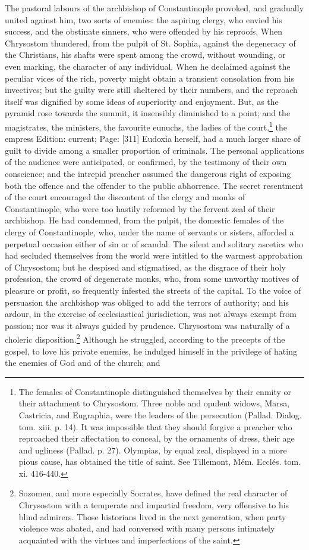 The pastoral labours of the archbishop of Constantinople provoked, and gradually united against him, two sorts of enemies: the aspiring clergy, who envied his success, and the obstinate sinners, who were offended by his reproofs. When Chrysostom thundered, from the pulpit of St. Sophia, against the degeneracy of the Christians, his shafts were spent among the crowd, without wounding, or even marking, the character of any individual. When he declaimed against the peculiar vices of the rich, poverty might obtain a transient consolation from his invectives; but the guilty were still sheltered by their numbers, and the reproach itself was dignified by some ideas of superiority and enjoyment. But, as the pyramid rose towards the summit, it insensibly diminished to a point; and the magistrates, the ministers, the favourite eunuchs, the ladies of the court,\footnote{The females of Constantinople distinguished themselves by their enmity or their attachment to Chrysostom. Three noble and opulent widows, Marsa, Castricia, and Eugraphia, were the leaders of the persecution (Pallad. Dialog. tom. xiii. p. 14). It was impossible that they should forgive a preacher who reproached their affectation to conceal, by the ornaments of dress, their age and ugliness (Pallad. p. 27). Olympias, by equal zeal, displayed in a more pious cause, has obtained the title of saint. See Tillemont, Mém. Ecclés. tom. xi. 416-440.} the empress Edition: current; Page: [311] Eudoxia herself, had a much larger share of guilt to divide among a smaller proportion of criminals. The personal applications of the audience were anticipated, or confirmed, by the testimony of their own conscience; and the intrepid preacher assumed the dangerous right of exposing both the offence and the offender to the public abhorrence. The secret resentment of the court encouraged the discontent of the clergy and monks of Constantinople, who were too hastily reformed by the fervent zeal of their archbishop. He had condemned, from the pulpit, the domestic females of the clergy of Constantinople, who, under the name of servants or sisters, afforded a perpetual occasion either of sin or of scandal. The silent and solitary ascetics who had secluded themselves from the world were intitled to the warmest approbation of Chrysostom; but he despised and stigmatised, as the disgrace of their holy profession, the crowd of degenerate monks, who, from some unworthy motives of pleasure or profit, so frequently infested the streets of the capital. To the voice of persuasion the archbishop was obliged to add the terrors of authority; and his ardour, in the exercise of ecclesiastical jurisdiction, was not always exempt from passion; nor was it always guided by prudence. Chrysostom was naturally of a choleric disposition.\footnote{Sozomen, and more especially Socrates, have defined the real character of Chrysostom with a temperate and impartial freedom, very offensive to his blind admirers. Those historians lived in the next generation, when party violence was abated, and had conversed with many persons intimately acquainted with the virtues and imperfections of the saint.} Although he struggled, according to the precepts of the gospel, to love his private enemies, he indulged himself in the privilege of hating the enemies of God and of the church; and 